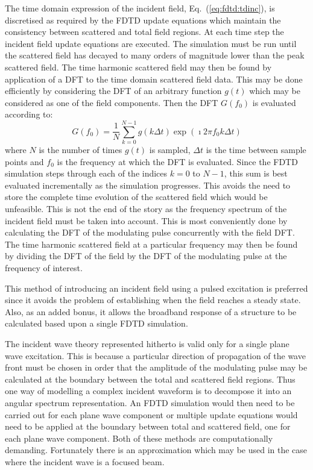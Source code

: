 \documentclass[a4paper, 12pt]{article}
\newcommand{\eq}[1]{Eq.\ (\ref{#1})}
\begin{document}
	The time domain expression of the incident field, \eq{eq:fdtd:tdinc}, is discretised as
	required by the FDTD update equations which maintain the consistency
	between scattered and total field regions. At each time step the
	incident field update equations are executed. The simulation must be
	run until the scattered field has decayed to many orders of magnitude
	lower than the peak scattered field. The time harmonic
	scattered field may then be found by application of a DFT to the time
	domain scattered field data. This may be done efficiently by
	considering the DFT of an arbitrary function $g(t)$ which may be
	considered as one of the field components. Then the DFT $G(f_0)$ is evaluated
	according to:
	\begin{equation}
		\label{eq:fdtd:dft}
		G(f_0)=\frac{1}{N}\sum^{N-1}_{k=0}g(k\Delta t)\exp(\imath2\pi f_0 k\Delta t)
	\end{equation}
	where $N$ is the number of times $g(t)$ is sampled, $\Delta t$ is the
	time between sample points and $f_0$ is the frequency at which the DFT
	is evaluated. Since the FDTD simulation steps through each of the
	indices $k=0$ to $N-1$, this sum is best evaluated incrementally as
	the simulation progresses. This avoids the need to store the complete
	time evolution of the scattered field which would be unfeasible. This
	is not the end of the story as the frequency spectrum of the incident
	field must be taken into account. This is most conveniently done by
	calculating the DFT of the modulating pulse concurrently with the
	field DFT. The time harmonic scattered field at a particular frequency
	may then be found by dividing the DFT of the field by the DFT of the
	modulating pulse at the frequency of interest.

	This method of introducing an incident field using a pulsed excitation
	is preferred since it avoids the problem of establishing when the
	field reaches a steady state. Also, as an added bonus, it allows the
	broadband response of a structure to be calculated based upon a single
	FDTD simulation.

	The incident wave theory represented hitherto is valid only for a single
	plane wave excitation. This is because a particular direction of
	propagation of the wave front must be chosen in order that the
	amplitude of the modulating pulse may be calculated at the boundary
	between the total and scattered field regions. Thus one way of
	modelling a complex incident waveform is to decompose it into an
	angular spectrum representation. An FDTD simulation would then need to
	be carried out for each plane wave component or multiple update
	equations would need to be applied at the boundary between total and
	scattered field, one for each plane wave component. Both of these
	methods are computationally demanding. Fortunately there is an
	approximation which may be used in the case where the incident wave is
	a focused beam.
\end{document}
